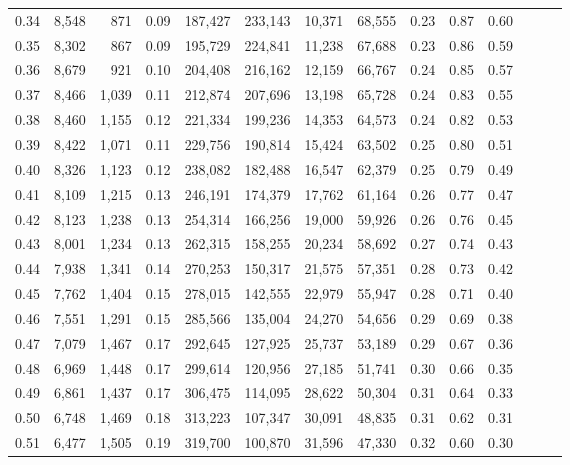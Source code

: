 \begin{tabular}{rrrrrrrrrrrrrr}
0.34 &   8,548 &    871 &  0.09 &  187,427 &  233,143 &  10,371 &  68,555 &  0.23 &  0.87 &      0.60 \\
0.35 &   8,302 &    867 &  0.09 &  195,729 &  224,841 &  11,238 &  67,688 &  0.23 &  0.86 &      0.59 \\
0.36 &   8,679 &    921 &  0.10 &  204,408 &  216,162 &  12,159 &  66,767 &  0.24 &  0.85 &      0.57 \\
0.37 &   8,466 &  1,039 &  0.11 &  212,874 &  207,696 &  13,198 &  65,728 &  0.24 &  0.83 &      0.55 \\
0.38 &   8,460 &  1,155 &  0.12 &  221,334 &  199,236 &  14,353 &  64,573 &  0.24 &  0.82 &      0.53 \\
0.39 &   8,422 &  1,071 &  0.11 &  229,756 &  190,814 &  15,424 &  63,502 &  0.25 &  0.80 &      0.51 \\
0.40 &   8,326 &  1,123 &  0.12 &  238,082 &  182,488 &  16,547 &  62,379 &  0.25 &  0.79 &      0.49 \\
0.41 &   8,109 &  1,215 &  0.13 &  246,191 &  174,379 &  17,762 &  61,164 &  0.26 &  0.77 &      0.47 \\
0.42 &   8,123 &  1,238 &  0.13 &  254,314 &  166,256 &  19,000 &  59,926 &  0.26 &  0.76 &      0.45 \\
0.43 &   8,001 &  1,234 &  0.13 &  262,315 &  158,255 &  20,234 &  58,692 &  0.27 &  0.74 &      0.43 \\
0.44 &   7,938 &  1,341 &  0.14 &  270,253 &  150,317 &  21,575 &  57,351 &  0.28 &  0.73 &      0.42 \\
0.45 &   7,762 &  1,404 &  0.15 &  278,015 &  142,555 &  22,979 &  55,947 &  0.28 &  0.71 &      0.40 \\
0.46 &   7,551 &  1,291 &  0.15 &  285,566 &  135,004 &  24,270 &  54,656 &  0.29 &  0.69 &      0.38 \\
0.47 &   7,079 &  1,467 &  0.17 &  292,645 &  127,925 &  25,737 &  53,189 &  0.29 &  0.67 &      0.36 \\
0.48 &   6,969 &  1,448 &  0.17 &  299,614 &  120,956 &  27,185 &  51,741 &  0.30 &  0.66 &      0.35 \\
0.49 &   6,861 &  1,437 &  0.17 &  306,475 &  114,095 &  28,622 &  50,304 &  0.31 &  0.64 &      0.33 \\
0.50 &   6,748 &  1,469 &  0.18 &  313,223 &  107,347 &  30,091 &  48,835 &  0.31 &  0.62 &      0.31 \\
0.51 &   6,477 &  1,505 &  0.19 &  319,700 &  100,870 &  31,596 &  47,330 &  0.32 &  0.60 &      0.30 \\

\end{tabular}
